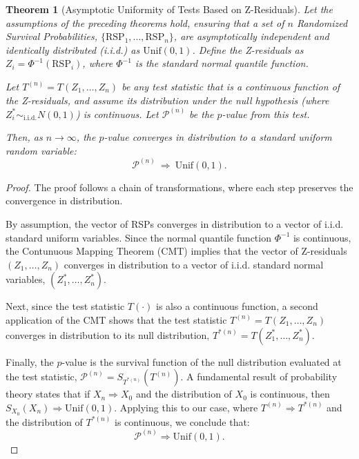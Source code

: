\documentclass[
  12pt]{article}
\theoremstyle{plain}
\newtheorem{theorem}{Theorem}[section]
\theoremstyle{definition}
\theoremstyle{remark}
\begin{document}
\begin{theorem}[Asymptotic Uniformity of Tests Based on Z-Residuals]
\label{thm:pvalunif}
Let the assumptions of the preceding theorems hold, ensuring that a set of $n$ Randomized Survival Probabilities, $\{\mathrm{RSP}_1, \dots, \mathrm{RSP}_n\}$, are asymptotically independent and identically distributed (i.i.d.) as $\mathrm{Unif}(0,1)$. Define the Z-residuals as $Z_i = \Phi^{-1}(\mathrm{RSP}_i)$, where $\Phi^{-1}$ is the standard normal quantile function.

Let $T^{(n)} = T(Z_1, \dots, Z_n)$ be any test statistic that is a continuous function of the Z-residuals, and assume its distribution under the null hypothesis (where $Z_i^* \sim_{\text{i.i.d.}} N(0,1)$) is continuous. Let $\mathcal{P}^{(n)}$ be the $p$-value from this test.

Then, as $n\to\infty$, the $p$-value converges in distribution to a standard uniform random variable:
\begin{equation}
\mathcal{P}^{(n)} \ \Rightarrow\ \mathrm{Unif}(0,1).
\end{equation}
\end{theorem}

\begin{proof}
The proof follows a chain of transformations, where each step preserves the convergence in distribution.

By assumption, the vector of RSPs converges in distribution to a vector of i.i.d. standard uniform variables. Since the normal quantile function $\Phi^{-1}$ is continuous, the Contunuous Mapping Theorem (CMT) implies that the vector of Z-residuals $(Z_1, \dots, Z_n)$ converges in distribution to a vector of i.i.d. standard normal variables, $(Z_1^*, \dots, Z_n^*)$.

Next, since the test statistic $T(\cdot)$ is also a continuous function, a second application of the CMT shows that the test statistic $T^{(n)} = T(Z_1, \dots, Z_n)$ converges in distribution to its null distribution, $T^{*(n)} = T(Z_1^*, \dots, Z_n^*)$.

Finally, the $p$-value is the survival function of the null distribution evaluated at the test statistic, $\mathcal{P}^{(n)} = S_{T^{*(n)}}(T^{(n)})$. A fundamental result of probability theory states that if $X_n \Rightarrow X_0$ and the distribution of $X_0$ is continuous, then $S_{X_0}(X_n) \Rightarrow \mathrm{Unif}(0,1)$. Applying this to our case, where $T^{(n)} \Rightarrow T^{*(n)}$ and the distribution of $T^{*(n)}$ is continuous, we conclude that:
\begin{equation}\mathcal{P}^{(n)} \Rightarrow \mathrm{Unif}(0,1).
\end{equation}
\end{proof}
\end{document}
